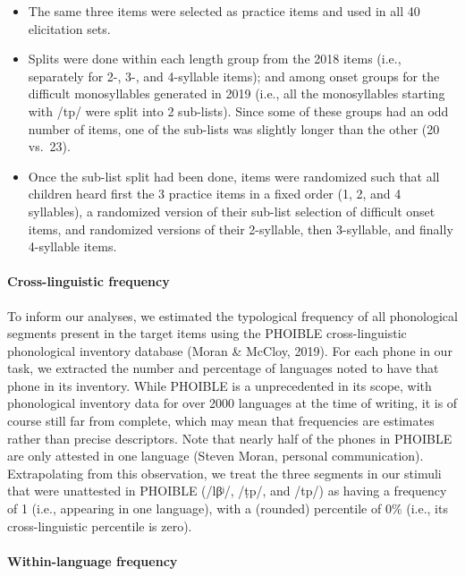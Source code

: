 \documentclass[
  american,
  ,man,floatsintext]{apa6}
\providecommand{\tightlist}{%
  \setlength{\itemsep}{0pt}\setlength{\parskip}{0pt}}
\let\oldparagraph\paragraph
\renewcommand{\paragraph}[1]{\oldparagraph{#1}\mbox{}}
\begin{document}
\begin{itemize}
\tightlist
\item
  The same three items were selected as practice items and used in all 40 elicitation sets.
\item
  Splits were done within each length group from the 2018 items (i.e., separately for 2-, 3-, and 4-syllable items); and among onset groups for the difficult monosyllables generated in 2019 (i.e., all the monosyllables starting with /tp/ were split into 2 sub-lists). Since some of these groups had an odd number of items, one of the sub-lists was slightly longer than the other (20 vs.~23).
\item
  Once the sub-list split had been done, items were randomized such that all children heard first the 3 practice items in a fixed order (1, 2, and 4 syllables), a randomized version of their sub-list selection of difficult onset items, and randomized versions of their 2-syllable, then 3-syllable, and finally 4-syllable items.
\end{itemize}

\hypertarget{cross-linguistic-frequency}{%
\paragraph{Cross-linguistic frequency}\label{cross-linguistic-frequency}}

To inform our analyses, we estimated the typological frequency of all phonological segments present in the target items using the PHOIBLE cross-linguistic phonological inventory database (Moran \& McCloy, 2019). For each phone in our task, we extracted the number and percentage of languages noted to have that phone in its inventory. While PHOIBLE is a unprecedented in its scope, with phonological inventory data for over 2000 languages at the time of writing, it is of course still far from complete, which may mean that frequencies are estimates rather than precise descriptors. Note that nearly half of the phones in PHOIBLE are only attested in one language (Steven Moran, personal communication). Extrapolating from this observation, we treat the three segments in our stimuli that were unattested in PHOIBLE (/lβʲ/, /ṭp/, and /tp/) as having a frequency of 1 (i.e., appearing in one language), with a (rounded) percentile of 0\% (i.e., its cross-linguistic percentile is zero).

\hypertarget{within-language-frequency}{%
\paragraph{Within-language frequency}\label{within-language-frequency}}
\end{document}
